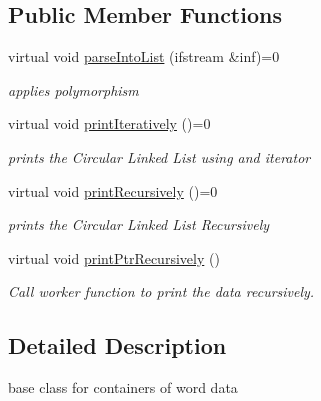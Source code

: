 \subsection*{Public Member Functions}
\begin{DoxyCompactItemize}
\item 
virtual void \hyperlink{classWordList_ab91a4f01d8dac96887c7ac2c56dad2cc}{parse\-Into\-List} (ifstream \&inf)=0
\begin{DoxyCompactList}\small\item\em applies polymorphism \end{DoxyCompactList}\item 
\hypertarget{classWordList_a26badccde80f7083b20b3ff66879277a}{virtual void \hyperlink{classWordList_a26badccde80f7083b20b3ff66879277a}{print\-Iteratively} ()=0}\label{classWordList_a26badccde80f7083b20b3ff66879277a}

\begin{DoxyCompactList}\small\item\em prints the Circular Linked List using and iterator \end{DoxyCompactList}\item 
\hypertarget{classWordList_af016ca3e7c27bf683df412ff54557ac3}{virtual void \hyperlink{classWordList_af016ca3e7c27bf683df412ff54557ac3}{print\-Recursively} ()=0}\label{classWordList_af016ca3e7c27bf683df412ff54557ac3}

\begin{DoxyCompactList}\small\item\em prints the Circular Linked List Recursively \end{DoxyCompactList}\item 
\hypertarget{classWordList_a4f1eaa87c656cce3a2a98c5a7285da98}{virtual void \hyperlink{classWordList_a4f1eaa87c656cce3a2a98c5a7285da98}{print\-Ptr\-Recursively} ()}\label{classWordList_a4f1eaa87c656cce3a2a98c5a7285da98}

\begin{DoxyCompactList}\small\item\em Call worker function to print the data recursively. \end{DoxyCompactList}\end{DoxyCompactItemize}


\subsection{Detailed Description}
base class for containers of word data 

